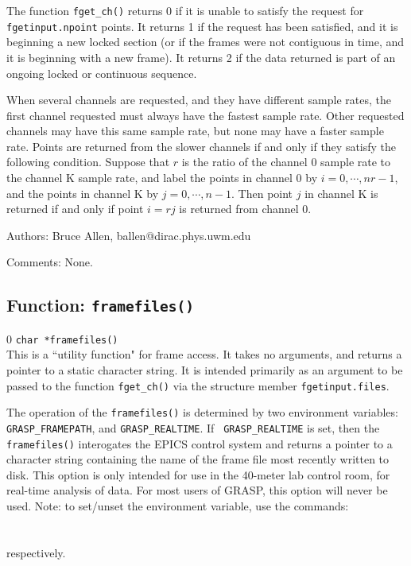 The function {\tt fget\_ch()} returns 0 if it is unable to satisfy
the request for {\tt fgetinput.npoint} points.  It returns 1 if the
request has been satisfied, and it is beginning a new locked section
(or if the frames were not contiguous in time, and it is beginning with
a new frame).  It returns 2 if the data returned is part of an ongoing
locked or continuous sequence.

When several channels are requested, and they have different sample rates,
the first channel requested must always have the fastest sample rate.
Other requested channels may have this same sample rate, but none may
have a faster sample rate.  Points are returned from the slower channels
if and only if they satisfy the following condition.  Suppose that $r$
is the ratio of the channel 0 sample rate to the channel K sample rate,
and label the points in channel 0 by $i=0,\cdots,n r - 1$, and the
points in channel K by $j=0,\cdots,n-1$.  Then point $j$ in channel K
is returned if and only if point $i=rj$ is returned from channel 0.

\begin{description}
\item{Authors:}
Bruce Allen, ballen@dirac.phys.uwm.edu
\item{Comments:}
None.
\end{description}
\clearpage


\subsection{Function: {\tt framefiles()} }
\setcounter{equation}0
{\tt char *framefiles() }\\
\noindent
This is a ``utility function" for frame access.  It takes no arguments, and returns a pointer
to a static character string.  It is intended primarily as an argument to be passed to the
function {\tt fget\_ch()} via the structure member
{\tt fgetinput.files}.

The operation of the {\tt framefiles()} is determined by two environment
variables: {\tt GRASP\_FRAMEPATH}, and {\tt GRASP\_REALTIME}.  If {\tt
GRASP\_REALTIME} is set, then the {\tt framefiles()} interogates the EPICS
control system and returns a pointer to a character string containing the
name of the frame file most recently written to disk.  This option is
only intended for use in the 40-meter lab control room, for real-time
analysis of data.  For most users of GRASP, this option will never
be used.  Note: to set/unset the environment variable, use the commands:\\
\\
\\
respectively.

